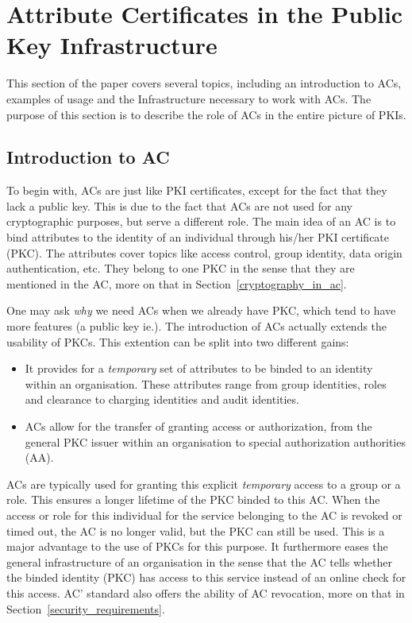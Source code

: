 \documentclass[10pt,conference,a4paper]{IEEEtran}
\begin{document}
\section{Attribute Certificates in the Public Key Infrastructure}
\label{ac_in_pki}
This section of the paper covers several topics, including an introduction to ACs, examples of usage and the Infrastructure necessary to work with  ACs. The purpose of this section is to describe the role of ACs in the entire picture of PKIs.
\subsection{Introduction to AC}
To begin with, ACs are just like PKI certificates, except for the fact that they lack a public key. This is due to the fact that ACs are not used for any cryptographic purposes, but serve a different role. The main idea of an AC is to bind attributes to the identity of an individual through his/her PKI certificate (PKC). The attributes cover topics like access control, group identity, data origin authentication, etc. They belong to one PKC in the sense that they are mentioned in the AC, more on that in Section~\ref{cryptography_in_ac}.

One may ask \textit{why} we need ACs when we already have PKC, which tend to have more features (a public key ie.). The introduction of ACs actually extends the usability of PKCs. This extention can be split into two different gains:
\begin{itemize}
	\item It provides for a \textit{temporary} set of attributes to be binded to an identity within an organisation. These attributes range from group identities, roles and clearance to charging identities and audit identities. 
	\item ACs allow for the transfer of granting access or authorization, from the general PKC issuer within an organisation to special authorization authorities (AA).
\end{itemize}

ACs are typically used for granting this explicit \textit{temporary} access to a group or a role. This ensures a longer lifetime of the PKC binded to this AC. When the access or role for this individual for the service belonging to the AC is revoked or timed out, the AC is no longer valid, but the PKC can still be used. This is a major advantage to the use of PKCs for this purpose. It furthermore eases the general infrastructure of an organisation in the sense that the AC tells whether the binded identity (PKC) has access to this service instead of an online check for this access. AC' standard also offers the ability of AC revocation, more on that in Section~\ref{security_requirements}.
\end{document}
